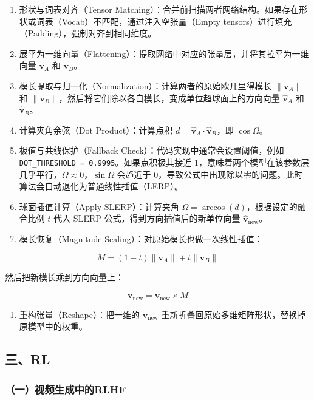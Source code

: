 \begin{enumerate}
\def\labelenumi{\arabic{enumi}.}
\item
  形状与词表对齐（Tensor Matching）：合并前扫描两者网络结构。如果存在形状或词表（Vocab）不匹配，通过注入空张量（Empty tensors）进行填充（Padding），强制对齐到相同维度。
\item
  展平为一维向量（Flattening）：提取网络中对应的张量层，并将其拉平为一维向量 \(\mathbf{v}_A\) 和 \(\mathbf{v}_B\)。
\item
  模长提取与归一化（Normalization）：计算两者的原始欧几里得模长 \(\|\mathbf{v}_A\|\) 和 \(\|\mathbf{v}_B\|\)，然后将它们除以各自模长，变成单位超球面上的方向向量 \(\hat{\mathbf{v}}_A\) 和 \(\hat{\mathbf{v}}_B\)。
\item
  计算夹角余弦（Dot Product）：计算点积 \(d=\hat{\mathbf{v}}_A\cdot\hat{\mathbf{v}}_B\)，即 \(\cos\Omega\)。
\item
  极值与共线保护（Fallback Check）：代码实现中通常会设置阈值，例如 \texttt{DOT\_THRESHOLD\ =\ 0.9995}。如果点积极其接近 1，意味着两个模型在该参数层几乎平行，\(\Omega\approx 0\)，\(\sin\Omega\) 会趋近于 0，导致公式中出现除以零的问题。此时算法会自动退化为普通线性插值（LERP）。
\item
  球面插值计算（Apply SLERP）：计算夹角 \(\Omega=\arccos(d)\)，根据设定的融合比例 \(t\) 代入 SLERP 公式，得到方向插值后的新单位向量 \(\hat{\mathbf{v}}_{\mathrm{new}}\)。
\item
  模长恢复（Magnitude Scaling）：对原始模长也做一次线性插值：
\end{enumerate}

\[
M=(1-t)\|\mathbf{v}_A\|+t\|\mathbf{v}_B\|
\]

然后把新模长乘到方向向量上：

\[
\mathbf{v}_{\mathrm{new}}=\hat{\mathbf{v}}_{\mathrm{new}}\times M
\]

\begin{enumerate}
\def\labelenumi{\arabic{enumi}.}
\setcounter{enumi}{7}
\tightlist
\item
  重构张量（Reshape）：把一维的 \(\mathbf{v}_{\mathrm{new}}\) 重新折叠回原始多维矩阵形状，替换掉原模型中的权重。
\end{enumerate}

\hypertarget{ux4e09rl}{%
\subsection{三、RL}\label{ux4e09rl}}

\hypertarget{ux4e00ux89c6ux9891ux751fux6210ux4e2dux7684rlhf}{%
\subsubsection{（一）视频生成中的RLHF}\label{ux4e00ux89c6ux9891ux751fux6210ux4e2dux7684rlhf}}

